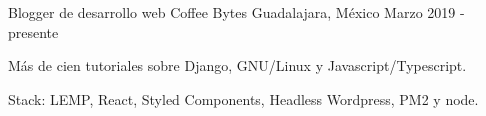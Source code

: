 \begin{cventries}
  \cventry
    {Blogger de desarrollo web}
    {Coffee Bytes}
    {Guadalajara, México}
    {Marzo 2019 - presente}
    {
      \begin{cvitems}
        \item {Más de cien tutoriales sobre Django, GNU/Linux y Javascript/Typescript.}
        \item {Stack: LEMP, React, Styled Components, Headless Wordpress, PM2 y node. }
      \end{cvitems}
    }

\end{cventries}

